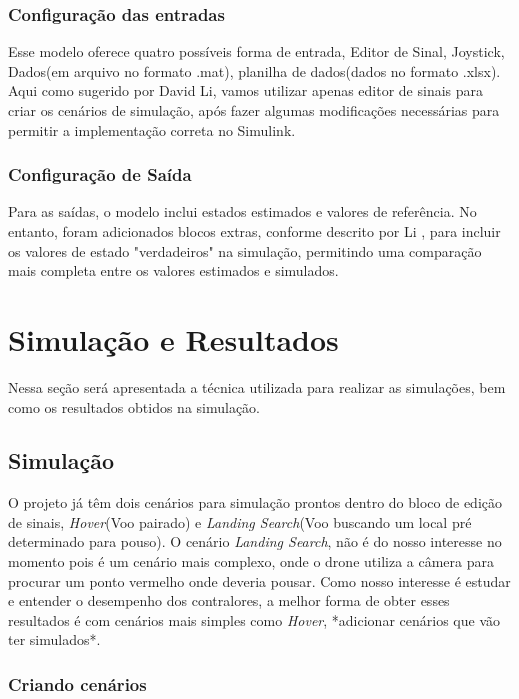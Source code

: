 \subsubsection{Configuração das entradas}

Esse modelo oferece quatro possíveis forma de entrada, Editor de Sinal, Joystick, Dados(em arquivo no formato .mat), planilha de dados(dados no formato .xlsx). Aqui como sugerido por David Li, vamos utilizar apenas editor de sinais para criar os cenários de simulação, após fazer algumas modificações necessárias para permitir a implementação correta no Simulink.

\subsubsection{Configuração de Saída}

Para as saídas, o modelo inclui estados estimados e valores de referência. No entanto, foram adicionados blocos extras, conforme descrito por Li \cite{li2022}, para incluir os valores de estado "verdadeiros" na simulação, permitindo uma comparação mais completa entre os valores estimados e simulados.

 
\section{Simulação e Resultados}

Nessa seção será apresentada a técnica utilizada para realizar as simulações, bem como os resultados obtidos na simulação.

\subsection{Simulação}

O projeto já têm dois cenários para simulação prontos dentro do bloco de edição de sinais, \textit{Hover}(Voo pairado) e \textit{Landing Search}(Voo buscando um local pré determinado para pouso). O cenário \textit{Landing Search}, não é do nosso interesse no momento pois é um cenário mais complexo, onde o drone utiliza a câmera para procurar um ponto vermelho onde deveria pousar. Como nosso interesse é estudar e entender o desempenho dos contralores, a melhor forma de obter esses resultados é com cenários mais simples como \textit{Hover}, *adicionar cenários que vão ter simulados*.

\subsubsection{Criando cenários}

